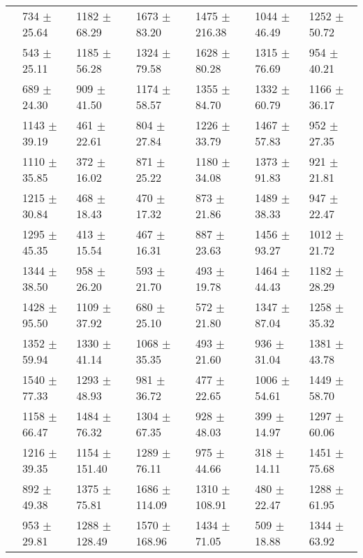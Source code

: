 \begin{table}
{\begin{tabular}[t]{rllllll}
\multirow{-2}{*}{\raggedleft\arraybackslash 7} & 734 $\pm$ 25.64 & 1182 $\pm$ 68.29 & 1673 $\pm$ 83.20 & 1475 $\pm$ 216.38 & 1044 $\pm$ 46.49 & 1252 $\pm$ 50.72\\
\cmidrule{1-7}
 & 543 $\pm$ 25.11 & 1185 $\pm$ 56.28 & 1324 $\pm$ 79.58 & 1628 $\pm$ 80.28 & 1315 $\pm$ 76.69 & 954 $\pm$ 40.21\\

\multirow{-2}{*}{\raggedleft\arraybackslash 8} & 689 $\pm$ 24.30 & 909 $\pm$ 41.50 & 1174 $\pm$ 58.57 & 1355 $\pm$ 84.70 & 1332 $\pm$ 60.79 & 1166 $\pm$ 36.17\\
\cmidrule{1-7}
 & 1143 $\pm$ 39.19 & 461 $\pm$ 22.61 & 804 $\pm$ 27.84 & 1226 $\pm$ 33.79 & 1467 $\pm$ 57.83 & 952 $\pm$ 27.35\\

\multirow{-2}{*}{\raggedleft\arraybackslash 9} & 1110 $\pm$ 35.85 & 372 $\pm$ 16.02 & 871 $\pm$ 25.22 & 1180 $\pm$ 34.08 & 1373 $\pm$ 91.83 & 921 $\pm$ 21.81\\
\cmidrule{1-7}
 & 1215 $\pm$ 30.84 & 468 $\pm$ 18.43 & 470 $\pm$ 17.32 & 873 $\pm$ 21.86 & 1489 $\pm$ 38.33 & 947 $\pm$ 22.47\\

\multirow{-2}{*}{\raggedleft\arraybackslash 10} & 1295 $\pm$ 45.35 & 413 $\pm$ 15.54 & 467 $\pm$ 16.31 & 887 $\pm$ 23.63 & 1456 $\pm$ 93.27 & 1012 $\pm$ 21.72\\
\cmidrule{1-7}
 & 1344 $\pm$ 38.50 & 958 $\pm$ 26.20 & 593 $\pm$ 21.70 & 493 $\pm$ 19.78 & 1464 $\pm$ 44.43 & 1182 $\pm$ 28.29\\

\multirow{-2}{*}{\raggedleft\arraybackslash 11} & 1428 $\pm$ 95.50 & 1109 $\pm$ 37.92 & 680 $\pm$ 25.10 & 572 $\pm$ 21.80 & 1347 $\pm$ 87.04 & 1258 $\pm$ 35.32\\
\cmidrule{1-7}
 & 1352 $\pm$ 59.94 & 1330 $\pm$ 41.14 & 1068 $\pm$ 35.35 & 493 $\pm$ 21.60 & 936 $\pm$ 31.04 & 1381 $\pm$ 43.78\\

\multirow{-2}{*}{\raggedleft\arraybackslash 12} & 1540 $\pm$ 77.33 & 1293 $\pm$ 48.93 & 981 $\pm$ 36.72 & 477 $\pm$ 22.65 & 1006 $\pm$ 54.61 & 1449 $\pm$ 58.70\\
\cmidrule{1-7}
 & 1158 $\pm$ 66.47 & 1484 $\pm$ 76.32 & 1304 $\pm$ 67.35 & 928 $\pm$ 48.03 & 399 $\pm$ 14.97 & 1297 $\pm$ 60.06\\

\multirow{-2}{*}{\raggedleft\arraybackslash 13} & 1216 $\pm$ 39.35 & 1154 $\pm$ 151.40 & 1289 $\pm$ 76.11 & 975 $\pm$ 44.66 & 318 $\pm$ 14.11 & 1451 $\pm$ 75.68\\
\cmidrule{1-7}
 & 892 $\pm$ 49.38 & 1375 $\pm$ 75.81 & 1686 $\pm$ 114.09 & 1310 $\pm$ 108.91 & 480 $\pm$ 22.47 & 1288 $\pm$ 61.95\\

\multirow{-2}{*}{\raggedleft\arraybackslash 14} & 953 $\pm$ 29.81 & 1288 $\pm$ 128.49 & 1570 $\pm$ 168.96 & 1434 $\pm$ 71.05 & 509 $\pm$ 18.88 & 1344 $\pm$ 63.92\\
\bottomrule
\end{tabular}}
\end{table}
